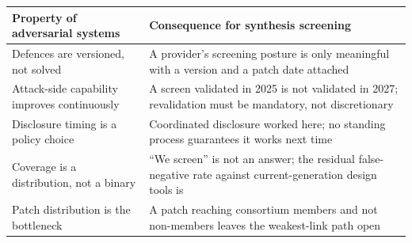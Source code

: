 \documentclass[11pt,letterpaper]{article}
\begin{document}
\begin{center}
\small
\begin{tabular}{L{5.5cm}L{9cm}}
\toprule
\textbf{Property of adversarial systems} & \textbf{Consequence for synthesis screening} \\
\midrule
Defences are versioned, not solved & A provider's screening posture is only meaningful with a version and a patch date attached \\
Attack-side capability improves continuously & A screen validated in 2025 is not validated in 2027; revalidation must be mandatory, not discretionary \\
Disclosure timing is a policy choice & Coordinated disclosure worked here; no standing process guarantees it works next time \\
Coverage is a distribution, not a binary & ``We screen'' is not an answer; the residual false-negative rate against current-generation design tools is \\
Patch distribution is the bottleneck & A patch reaching consortium members and not non-members leaves the weakest-link path open \\
\bottomrule
\end{tabular}
\end{center}

\vspace{0.4em}
\end{document}
